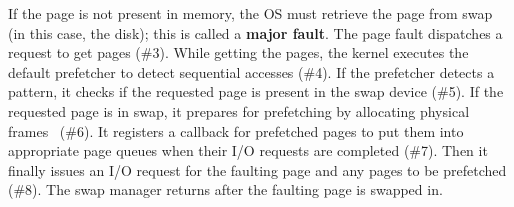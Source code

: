 If the page is not present in memory, the OS must retrieve the page from swap (in this case, the disk); this is called a \textbf{major fault}. The page fault dispatches a request to get pages (\#3). While getting the pages, the kernel executes the default prefetcher to detect sequential accesses (\#4). If the prefetcher detects a pattern, it checks if the requested page is present in the swap device (\#5). 
If the requested page is in swap, it prepares for prefetching by allocating physical frames~ (\#6).
It registers a callback for prefetched pages to put them into appropriate page queues when their I/O requests are completed (\#7).
Then it finally issues an I/O request for the faulting page and any pages to be prefetched (\#8). 
The swap manager returns after the faulting page is swapped in. 





